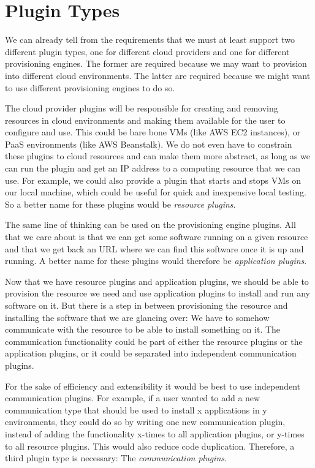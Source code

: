 \section{Plugin Types}
\label{design:plugins}

We can already tell from the requirements that we must at least support two different plugin types, one for different cloud providers and one for different provisioning engines.
The former are required because we may want to provision into different cloud environments.
The latter are required because we might want to use different provisioning engines to do so.

The cloud provider plugins will be responsible for creating and removing resources in cloud environments and making them available for the user to configure and use.
This could be bare bone VMs (like AWS EC2 instances), or PaaS environments (like AWS Beanstalk).
We do not even have to constrain these plugins to cloud resources and can make them more abstract, as long as we can run the plugin and get an IP address to a computing resource that we can use.
For example, we could also provide a plugin that starts and stops VMs on our local machine, which could be useful for quick and inexpensive local testing.
So a better name for these plugins would be \textit{resource plugins}.

The same line of thinking can be used on the provisioning engine plugins.
All that we care about is that we can get some software running on a given resource and that we get back an URL where we can find this software once it is up and running.
A better name for these plugins would therefore be \textit{application plugins}.

Now that we have resource plugins and application plugins, we should be able to provision the resource we need and use application plugins to install and run any software on it.
But there is a step in between provisioning the resource and installing the software that we are glancing over: We have to somehow communicate with the resource to be able to install something on it.
The communication functionality could be part of either the resource plugins or the application plugins, or it could be separated into independent communication plugins.

For the sake of efficiency and extensibility it would be best to use independent communication plugins.
For example, if a user wanted to add a new communication type that should be used to install x applications in y environments, they could do so by writing one new communication plugin, instead of adding the functionality x-times to all application plugins, or y-times to all resource plugins.
This would also reduce code duplication.
Therefore, a third plugin type is necessary: The \textit{communication plugins}.

